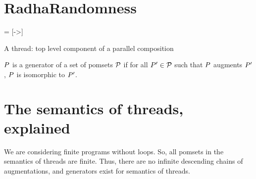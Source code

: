 \section{RadhaRandomness}

\newcommand{\acylic}{\mathit{acyclic}}

 = [->]
\newcommand{\fvarsc}{\mathit{varsc}}
\newcommand{\rvarsc}{\ensuremath{\mathrel{\mathsf{varsc}}}}%
\newcommand{\xvarsc}{\xarrowtikz{varsc}{varsc}}

\newcommand{\reads}{\mathit{Reads}}
\newcommand{\Seq}{{\tt Sequential}}

\newcommand{\writes}{\mathit{Writes}}
\newcommand{\pomf}[1]{Fun_{#1}}
\newcommand{\pomFn}{\mathit{PomFn}}
\newcommand{\power}{\mathcal{P}}
\newcommand{\aFn}{F}
\newcommand{\aRSet}{R}
\newcommand{\bRSet}{S}
\newcommand{\aWSet}{U}
\newcommand{\bWSet}{V}
\newcommand{\aWrite}{\aAct_w}
\newcommand{\bPS}{\aPS'}

\begin{definition}
A thread: top level component of a parallel composition
\end{definition}



\begin{definition}
$P$ is a generator of a set of pomsets $\mathcal{P}$ if for all $\bPS \in \aPSS$ such that $P$ augments $\bPS$, $P$ is isomorphic to $\bPS$.
\end{definition}


\section{The semantics  of threads, explained}
We are considering finite programs without loops.  So,  all pomsets in the semantics of threads are finite.  Thus, there are no infinite descending chains of augmentations, and  generators exist for semantics of threads.

